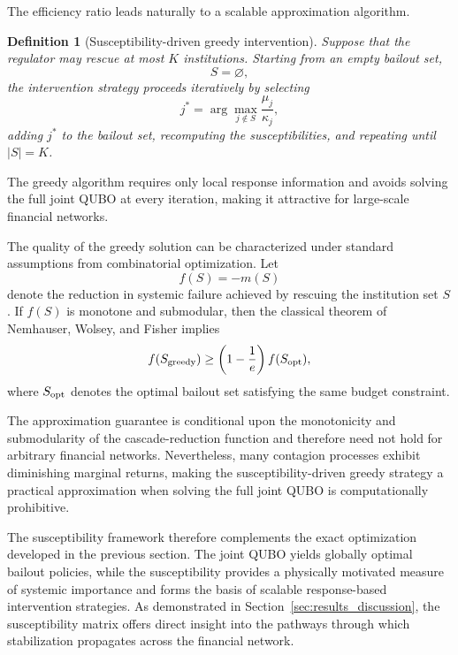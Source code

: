 \documentclass[aps,reprint,superscriptaddress,pra]{revtex4-2}
\newtheorem{definition}{Definition}
\begin{document}
The efficiency ratio leads naturally to a scalable approximation algorithm.

\begin{definition}[Susceptibility-driven greedy intervention]
Suppose that the regulator may rescue at most $K$ institutions. Starting from an empty bailout set,
\[
S=\varnothing,
\]
the intervention strategy proceeds iteratively by selecting
\begin{equation}
j^\ast
=
\arg\max_{j\notin S}
\frac{\mu_j}{\kappa_j},
\end{equation}
adding $j^\ast$ to the bailout set, recomputing the susceptibilities, and repeating until $|S|=K$.
\end{definition}\cite{nemhauser1978analysis,
kempe2003maximizing,
kitsak2010identification}

The greedy algorithm requires only local response information and avoids solving the full joint QUBO at every iteration, making it attractive for large-scale financial networks.

The quality of the greedy solution can be characterized under standard assumptions from combinatorial optimization. Let
\begin{equation}
f(S)
=
-m(S)
\end{equation}
denote the reduction in systemic failure achieved by rescuing the institution set $S$. If $f(S)$ is monotone and submodular, then the classical theorem of Nemhauser, Wolsey, and Fisher \cite{nemhauser1978analysis} implies
\begin{equation}
f(S_{\rm greedy})
\ge
\left(1-\frac1e\right)
f(S_{\rm opt}),
\label{eq:approximation_bound}
\end{equation}
where $S_{\rm opt}$ denotes the optimal bailout set satisfying the same budget constraint.

The approximation guarantee is conditional upon the monotonicity and submodularity of the cascade-reduction function and therefore need not hold for arbitrary financial networks. Nevertheless, many contagion processes exhibit diminishing marginal returns, making the susceptibility-driven greedy strategy a practical approximation when solving the full joint QUBO is computationally prohibitive.

The susceptibility framework therefore complements the exact optimization developed in the previous section. The joint QUBO yields globally optimal bailout policies, while the susceptibility provides a physically motivated measure of systemic importance and forms the basis of scalable response-based intervention strategies. As demonstrated in Section~\ref{sec:results_discussion}, the susceptibility matrix offers direct insight into the pathways through which stabilization propagates across the financial network.
\end{document}
